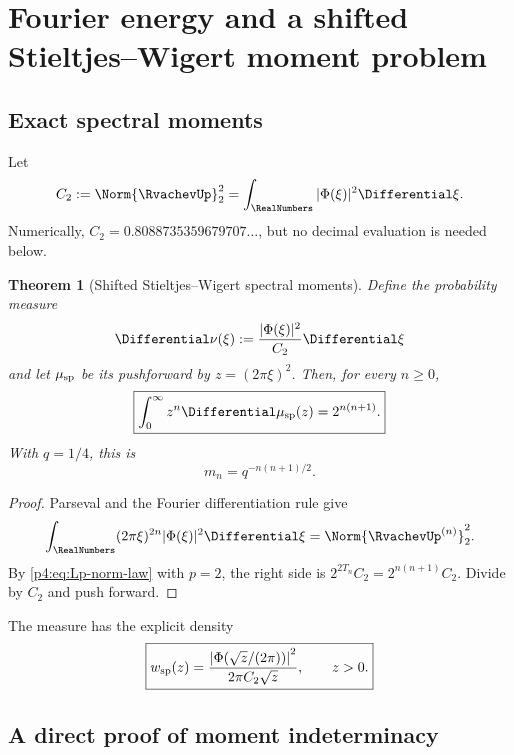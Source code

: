\documentclass[11pt,oneside]{article}
\newtheorem{theorem}{Theorem}[section]
\theoremstyle{definition}
\theoremstyle{remark}
\begin{document}
\section{Fourier energy and a shifted Stieltjes--Wigert moment problem}
\label{p4:sec:stieltjes-wigert}

\subsection{Exact spectral moments}

Let
\begin{equation}
 C_2:=\Norm{\RvachevUp}_2^2=\int_{\RealNumbers}|\Phi(\xi)|^2\Differential\xi.
 \label{p4:eq:C2}
\end{equation}
Numerically, $C_2=0.8088735359679707\ldots$, but no decimal evaluation is needed below.

\begin{theorem}[Shifted Stieltjes--Wigert spectral moments]
\label{p4:thm:spectral-moments}
Define the probability measure
\begin{equation}
 \Differential\nu(\xi):=\frac{|\Phi(\xi)|^2}{C_2}\Differential\xi
 \label{p4:eq:nu-frequency}
\end{equation}
and let $\mu_{\rm sp}$ be its pushforward by
$z=(2\pi\xi)^2$.  Then, for every $n\geq0$,
\begin{equation}
 \boxed{
 \int_0^\infty z^n\Differential\mu_{\rm sp}(z)
 =2^{n(n+1)}.}
 \label{p4:eq:spectral-moment-sequence}
\end{equation}
With $q=1/4$, this is
\begin{equation}
 m_n=q^{-n(n+1)/2}.
 \label{p4:eq:q-moments}
\end{equation}
\end{theorem}

\begin{proof}
Parseval and the Fourier differentiation rule give
\[
 \int_{\RealNumbers}(2\pi\xi)^{2n}|\Phi(\xi)|^2\Differential\xi
 =\Norm{\RvachevUp^{(n)}}_2^2.
\]
By \eqref{p4:eq:Lp-norm-law} with $p=2$, the right side is
$2^{2T_n}C_2=2^{n(n+1)}C_2$.  Divide by $C_2$ and push forward.
\end{proof}

The measure has the explicit density
\begin{equation}
 \boxed{
 w_{\rm sp}(z)
 =\frac{\left|\Phi\!\left(\sqrt z/(2\pi)\right)\right|^2}
 {2\pi C_2\sqrt z},
 \qquad z>0.}
 \label{p4:eq:spectral-density}
\end{equation}

\subsection{A direct proof of moment indeterminacy}
\end{document}
